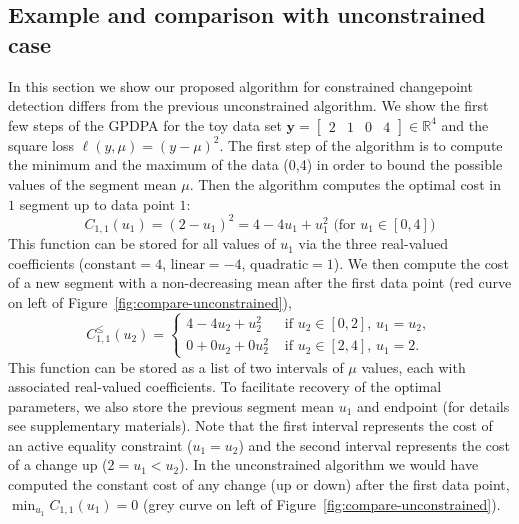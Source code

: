 \documentclass[twoside,11pt]{article}
\newcommand{\RR}{\mathbb R}
\begin{document}
\subsection{Example and comparison with unconstrained case}
\label{sec:example-comparison}

In this section we show our proposed algorithm for constrained
changepoint detection differs from the previous unconstrained
algorithm. We show the first few steps of the GPDPA for the toy data
set $\mathbf y= \left[
\begin{array}{cccccc}
  2 & 1 & 0 & 4
\end{array}
\right] \in\RR^4$ and the square loss $\ell(y,\mu)=(y-\mu)^2$. The first
step of the algorithm is to compute the minimum and the maximum of the
data (0,4) in order to bound the possible values of the segment
mean $\mu$. Then the algorithm computes the optimal cost in $1$ segment up
to data point $1$:
\begin{equation}
  C_{1,1}(u_1) = (2-u_1)^2=4 - 4u_1 + u_1^2\text{ (for $u_1\in[0,4]$)}
\end{equation}
This function can be stored for all values of $u_1$ via the three
real-valued coefficients ($\text{constant}=4$, $\text{linear}=-4$,
$\text{quadratic}=1$). We then compute the cost of a new segment with
a non-decreasing mean after the first data point (red curve on left of
Figure~\ref{fig:compare-unconstrained}),
\begin{equation}
  C_{1,1}^\leq(u_2) =
  \begin{cases}
    4 - 4 u_2 + u_2^2 &\text{ if }u_2\in[0,2],\, u_1=u_2,\\
    0 + 0 u_2 + 0 u_2^2 & \text{ if }u_2\in[2,4],\,  u_1=2.
  \end{cases}
\end{equation}
This function can be stored as a list of two intervals of $\mu$
values, each with associated real-valued coefficients. To facilitate
recovery of the optimal parameters, we also store the previous segment
mean $u_1$ and endpoint (for details see supplementary
materials). Note that the first interval represents the cost of an
active equality constraint ($u_1=u_2$) and the second interval
represents the cost of a change up ($2=u_1<u_2$). In the unconstrained
algorithm we would have computed the constant cost of any change (up
or down) after the first data point, $\min_{u_1} C_{1,1}(u_1) =0$
(grey curve on left of Figure~\ref{fig:compare-unconstrained}).
\end{document}
